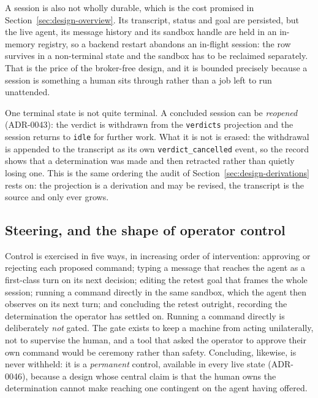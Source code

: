 A session is also not wholly durable, which is the cost promised in
Section~\ref{sec:design-overview}. Its transcript, status and goal are persisted,
but the live agent, its message history and its sandbox handle are held in an
in-memory registry, so a backend restart abandons an in-flight session: the row
survives in a non-terminal state and the sandbox has to be reclaimed separately.
That is the price of the broker-free design, and it is bounded precisely because a
session is something a human sits through rather than a job left to run unattended.

One terminal state is not quite terminal. A concluded session can be
\emph{reopened} (ADR-0043): the verdict is withdrawn from the \texttt{verdicts}
projection and the session returns to \texttt{idle} for further work. What it is
not is erased: the withdrawal is appended to the transcript as its own
\texttt{verdict\_cancelled} event, so the record shows that a determination was
made and then retracted rather than quietly losing one. This is the same ordering
the audit of Section~\ref{sec:design-derivations} rests on: the projection is a
derivation and may be revised, the transcript is the source and only ever grows.

\subsection{Steering, and the shape of operator control}

Control is exercised in five ways, in increasing order of intervention: approving
or rejecting each proposed command; typing a message that reaches the agent as a
first-class turn on its next decision; editing the retest goal that frames the
whole session; running a command directly in the same sandbox, which the agent
then observes on its next turn; and concluding the retest outright, recording the
determination the operator has settled on. Running a command directly is
deliberately \emph{not} gated. The gate exists to keep a machine from acting
unilaterally, not to supervise the human, and a tool that asked the operator to
approve their own command would be ceremony rather than safety. Concluding,
likewise, is never withheld: it is a \emph{permanent} control, available in every
live state (ADR-0046), because a design whose central claim is that the human owns
the determination cannot make reaching one contingent on the agent having offered.

